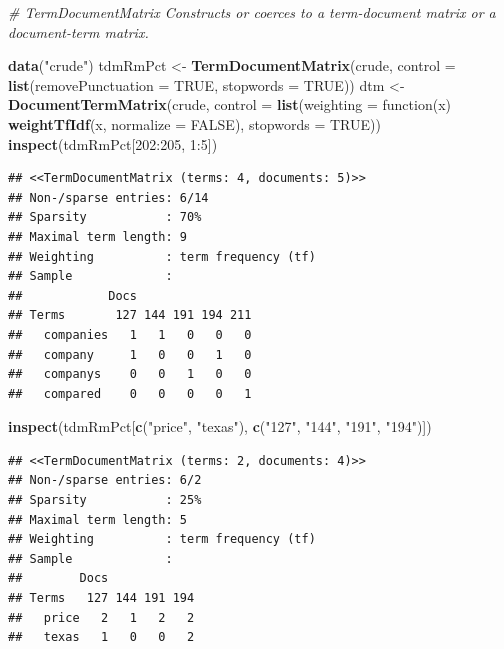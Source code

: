 \documentclass[]{book}
\newenvironment{Shaded}{\begin{snugshade}}{\end{snugshade}}
\newcommand{\KeywordTok}[1]{\textcolor[rgb]{0.13,0.29,0.53}{\textbf{{#1}}}}
\newcommand{\DataTypeTok}[1]{\textcolor[rgb]{0.13,0.29,0.53}{{#1}}}
\newcommand{\DecValTok}[1]{\textcolor[rgb]{0.00,0.00,0.81}{{#1}}}
\newcommand{\StringTok}[1]{\textcolor[rgb]{0.31,0.60,0.02}{{#1}}}
\newcommand{\CommentTok}[1]{\textcolor[rgb]{0.56,0.35,0.01}{\textit{{#1}}}}
\newcommand{\OtherTok}[1]{\textcolor[rgb]{0.56,0.35,0.01}{{#1}}}
\newcommand{\NormalTok}[1]{{#1}}
\begin{document}
\begin{Shaded}
\begin{Highlighting}[]
\CommentTok{# TermDocumentMatrix  Constructs or coerces to a term-document matrix or a document-term matrix.}

\KeywordTok{data}\NormalTok{(}\StringTok{"crude"}\NormalTok{)}
\NormalTok{tdmRmPct <-}\StringTok{ }\KeywordTok{TermDocumentMatrix}\NormalTok{(crude, }\DataTypeTok{control =} \KeywordTok{list}\NormalTok{(}\DataTypeTok{removePunctuation =} \OtherTok{TRUE}\NormalTok{,}
                                                \DataTypeTok{stopwords =} \OtherTok{TRUE}\NormalTok{))}
\NormalTok{dtm <-}\StringTok{ }\KeywordTok{DocumentTermMatrix}\NormalTok{(crude, }\DataTypeTok{control =} \KeywordTok{list}\NormalTok{(}\DataTypeTok{weighting =} \NormalTok{function(x) }\KeywordTok{weightTfIdf}\NormalTok{(x, }\DataTypeTok{normalize =}
\OtherTok{FALSE}\NormalTok{),}
\DataTypeTok{stopwords =} \OtherTok{TRUE}\NormalTok{))}
\KeywordTok{inspect}\NormalTok{(tdmRmPct[}\DecValTok{202}\NormalTok{:}\DecValTok{205}\NormalTok{, }\DecValTok{1}\NormalTok{:}\DecValTok{5}\NormalTok{])}
\end{Highlighting}
\end{Shaded}

\begin{verbatim}
## <<TermDocumentMatrix (terms: 4, documents: 5)>>
## Non-/sparse entries: 6/14
## Sparsity           : 70%
## Maximal term length: 9
## Weighting          : term frequency (tf)
## Sample             :
##            Docs
## Terms       127 144 191 194 211
##   companies   1   1   0   0   0
##   company     1   0   0   1   0
##   companys    0   0   1   0   0
##   compared    0   0   0   0   1
\end{verbatim}

\begin{Shaded}
\begin{Highlighting}[]
\KeywordTok{inspect}\NormalTok{(tdmRmPct[}\KeywordTok{c}\NormalTok{(}\StringTok{"price"}\NormalTok{, }\StringTok{"texas"}\NormalTok{), }\KeywordTok{c}\NormalTok{(}\StringTok{"127"}\NormalTok{, }\StringTok{"144"}\NormalTok{, }\StringTok{"191"}\NormalTok{, }\StringTok{"194"}\NormalTok{)])}
\end{Highlighting}
\end{Shaded}

\begin{verbatim}
## <<TermDocumentMatrix (terms: 2, documents: 4)>>
## Non-/sparse entries: 6/2
## Sparsity           : 25%
## Maximal term length: 5
## Weighting          : term frequency (tf)
## Sample             :
##        Docs
## Terms   127 144 191 194
##   price   2   1   2   2
##   texas   1   0   0   2
\end{verbatim}
\end{document}
